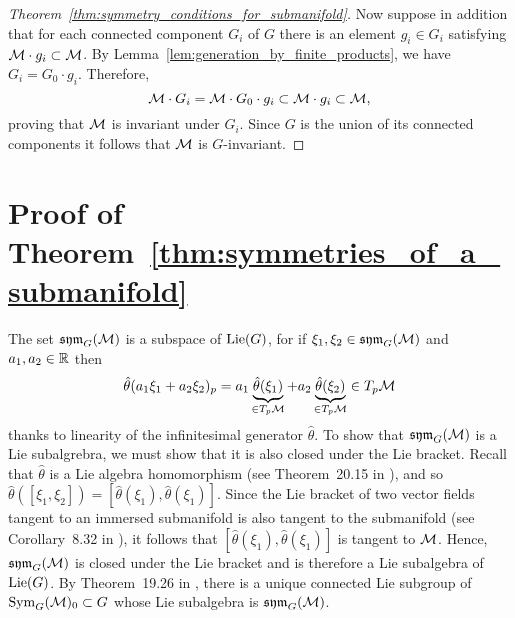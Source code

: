 \documentclass[twoside,11pt]{article}
\begin{document}
\begin{proof}[Theorem~\ref{thm:symmetry_conditions_for_submanifold}]
Now suppose in addition that for each connected component $G_i$ of $G$ there is an element $g_i \in G_i$ satisfying ${\mathcal{M}} \cdot g_i \subset {\mathcal{M}}$.
By Lemma~\ref{lem:generation_by_finite_products}, we have $G_i = G_0 \cdot g_i$.
Therefore,
\begin{equation}
    {\mathcal{M}} \cdot G_i 
    = {\mathcal{M}} \cdot G_0 \cdot g_i \subset {\mathcal{M}} \cdot g_i \subset {\mathcal{M}},
\end{equation}
proving that ${\mathcal{M}}$ is invariant under $G_i$.
Since $G$ is the union of its connected components it follows that ${\mathcal{M}}$ is $G$-invariant.
\end{proof}

\section{Proof of Theorem~\ref{thm:symmetries_of_a_submanifold}}
\label{app:symmetries_of_a_submanifold}

    The set $\operatorname{\mathfrak{sym}}_G({\mathcal{M}})$ is a subspace of $\operatorname{Lie}(G)$, for if $\xi_1, \xi_2 \in \operatorname{\mathfrak{sym}}_G({\mathcal{M}})$ and $a_1, a_2 \in \mathbb{R}$ then
    \begin{equation}
        \hat{\theta}(a_1 \xi_1 + a_2 \xi_2)_p = a_1 \underbrace{\hat{\theta}(\xi_1)}_{\in T_p{\mathcal{M}}} + a_2 \underbrace{\hat{\theta}(\xi_2)}_{\in T_p{\mathcal{M}}} \in T_p{\mathcal{M}}
    \end{equation}
    thanks to linearity of the infinitesimal generator $\hat{\theta}$.
    To show that $\operatorname{\mathfrak{sym}}_G({\mathcal{M}})$ is a Lie subalgrebra, we must show that it is also closed under the Lie bracket.
    Recall that $\hat{\theta}$ is a Lie algebra homomorphism (see Theorem~20.15 in \cite{Lee2013introduction}), and so $\hat{\theta}([\xi_1, \xi_2]) = [\hat{\theta}(\xi_1), \hat{\theta}(\xi_1)]$.
    Since the Lie bracket of two vector fields tangent to an immersed submanifold is also tangent to the submanifold (see Corollary~8.32 in \cite{Lee2013introduction}), it follows that $[\hat{\theta}(\xi_1), \hat{\theta}(\xi_1)]$ is tangent to ${\mathcal{M}}$.
    Hence, $\operatorname{\mathfrak{sym}}_G({\mathcal{M}})$ is closed under the Lie bracket and is therefore a Lie subalgebra of $\operatorname{Lie}(G)$.
    By Theorem~19.26 in \cite{Lee2013introduction}, there is a unique connected Lie subgroup of $\operatorname{Sym}_G({\mathcal{M}})_0\subset G$ whose Lie subalgebra is $\operatorname{\mathfrak{sym}}_G({\mathcal{M}})$.
\end{document}
